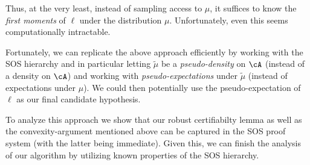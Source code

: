 {Thus, at the very least, instead of sampling access to $\mu$, it suffices to know the \emph{first moments} of $\ell$ under the distribution $\mu$. Unfortunately, even this seems computationally intractable. 

Fortunately, we can replicate the above approach efficiently by working with the SOS hierarchy and in particular letting $\widetilde{\mu}$ be a \emph{pseudo-density} on $\cA$ (instead of a density on $\cA$) and working with \emph{pseudo-expectations} under $\widetilde{\mu}$ (instead of expectations under $\mu$). We could then potentially use the pseudo-expectation of $\ell$ as our final candidate hypothesis. 

To analyze this approach we show that our robust certifiabilty lemma as well as the convexity-argument mentioned above can be captured in the SOS proof system (with the latter being immediate). Given this, we can finish the analysis of our algorithm by utilizing known properties of the SOS hierarchy.  }

